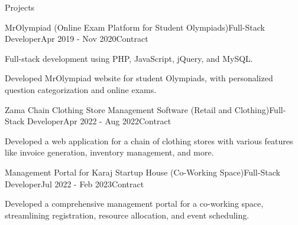 \documentclass[]{kyvernitis-resume}
\begin{document}
\begin{section}{Projects}
\begin{subsection}{MrOlympiad (Online Exam Platform for Student Olympiads)}{Full-Stack Developer}{Apr 2019 - Nov 2020}{Contract}
\item Full-stack development using PHP, JavaScript, jQuery, and MySQL.
\item Developed MrOlympiad website for student Olympiads, with personalized question categorization and online exams.
\end{subsection}
\begin{subsection}{Zama Chain Clothing Store Management Software (Retail and Clothing)}{Full-Stack Developer}{Apr 2022 - Aug 2022}{Contract}
\item Developed a web application for a chain of clothing stores with various features like invoice generation, inventory management, and more.
\end{subsection}

\begin{subsection}{Management Portal for Karaj Startup House (Co-Working Space)}{Full-Stack Developer}{Jul 2022 - Feb 2023}{Contract}
 		\item Developed a comprehensive management portal for a co-working space, streamlining registration, resource allocation, and event scheduling.
\end{subsection}


    \end{section}


\end{document}
